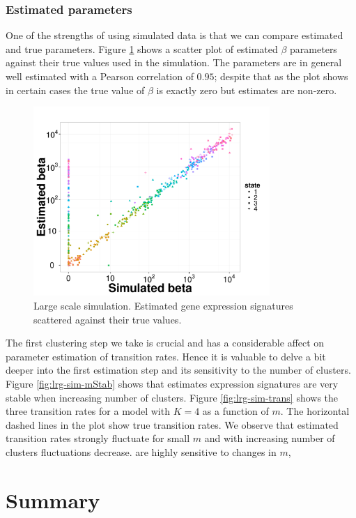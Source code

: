 \subsubsection{Estimated parameters}
\label{sec:transition-rates}

One of the strengths of using simulated data is that we can compare estimated and true parameters. Figure \ref{fig:lrg-sim-scatter-b} shows a scatter plot of estimated $\beta$ parameters against their true values used in the simulation. The parameters are in general well estimated with a Pearson correlation of $0.95$; despite that as the plot shows in certain cases the true value of $\beta$ is exactly zero but estimates are non-zero. 

\begin{figure}
  \centering
  \includegraphics[width=0.8\textwidth]{pics/beta-sim.pdf}
  \caption{Large scale simulation. Estimated gene expression signatures scattered against their true values. }

  \label{fig:lrg-sim-scatter-b}
\end{figure}

The first clustering step we take is crucial and has a considerable affect on parameter estimation of transition rates. Hence it is valuable to delve a bit deeper into the first estimation step and its sensitivity to the number of clusters. Figure \ref{fig:lrg-sim-mStab} shows that estimates expression signatures are very stable when increasing number of clusters. Figure \ref{fig:lrg-sim-trans} shows the three transition rates for a model with $K=4$ as a function of $m$. The horizontal dashed lines in the plot show true transition rates. We observe that estimated transition rates strongly fluctuate for small $m$ and with increasing number of clusters fluctuations decrease. are highly sensitive to changes in $m$,

\section{Summary}
\label{sec:summary}




